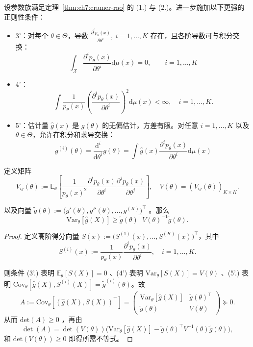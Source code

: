 \begin{theorem}[Bhattacharyya 下界]
\label{thm:ch7:bhattacharyya}

设参数族满足定理~\ref{thm:ch7:cramer-rao} 的 (1.) 与 (2.)。进一步施加以下更强的正则性条件：

\begin{itemize}
\tightlist
\item
  3'：对每个 $\theta\in\Theta$，导数 $\frac{\partial^i p_\theta(x)}{\partial\theta^i},\ i=1,\dots,K$ 存在，且各阶导数可与积分交换： \[\int_{\mathcal{X}} \frac{\partial^i p_\theta(x)}{\partial\theta^i} \mathrm d\mu(x) = 0, \qquad i=1,\dots,K\]\item
  4'：
  \[
  \int\frac{1}{p_\theta(x)}\left(\frac{\partial^i p_\theta(x)}{\partial\theta^i}\right)^2 \mathrm d\mu(x) < \infty, \quad i=1,\dots,K.
  \]
\item
  5'：估计量 $\widehat{g}(x)$ 是 $g(\theta)$ 的无偏估计，方差有限。对任意 $i=1,\dots,K$ 以及 $\theta\in\Theta$，允许在积分和求导交换： \[g^{(i)}(\theta) = \frac{\mathrm d^i}{\mathrm d\theta^i} g(\theta) = \int  \widehat{g}(x) \frac{\partial^i p_\theta(x)}{\partial\theta^i} \mathrm d\mu(x)\]\end{itemize}

定义矩阵
\[
V_{ij}(\theta):=\mathbb E_\theta\left[\frac1{p_\theta(x)^2}\frac{\partial^ip_\theta(x)}{\partial\theta^i}\frac{\partial^jp_\theta(x)}{\partial\theta^j}\right],\quad V(\theta)=(V_{ij}(\theta))_{K\times K}.
\]

以及向量 $\widetilde g(\theta):=\big(g'(\theta),g''(\theta),\dots,g^{(K)}\big)^\top$ 。那么
\[
\mathrm{Var}_\theta[\widehat g(X)]\ge \widetilde g(\theta)^\top V(\theta)^{-1}\widetilde g(\theta).
\]

\end{theorem}

\begin{proof}

定义高阶得分向量 $S(x) := \big(S^{(1)}(x),\dots,S^{(K)}(x)\big)^\top$，其中
\[
S^{(i)}(x) := \frac{1}{p_\theta(x)} \frac{\partial^i p_\theta(x)}{\partial\theta^i}, \quad i=1,\dots,K.
\]

则条件 (3'.) 表明 $\mathbb{E}_\theta[S(X)]=0$ 、(4') 表明 $\mathrm{Var}_\theta[S(X)]=V(\theta)$ 、(5'.) 表明 $\mathrm{Cov}_\theta[\widehat{g}(X), S^{(i)}(X)] = \widetilde{g}^{(i)}(\theta)$。故
\[
A:=\mathrm{Cov}_\theta\left[(\widehat g(X),S(X))^\top\right]=\begin{pmatrix} \mathrm{Var}_\theta[\widehat{g}(X)] & \widetilde{g}(\theta)^\top \\ \widetilde{g}(\theta) & V(\theta) \end{pmatrix}\succeq 0.
\]
从而 $\mathrm{det}(A)\ge 0$ ，再由
\[
\det(A) = \det(V(\theta)) \bigl( \mathrm{Var}_\theta[\widehat{g}(X)] - \widetilde{g}(\theta)^\top V^{-1}(\theta) \widetilde{g}(\theta) \bigr),
\]
和 $\mathrm{det}(V(\theta))\ge 0$ 即得所需不等式。

\end{proof}

